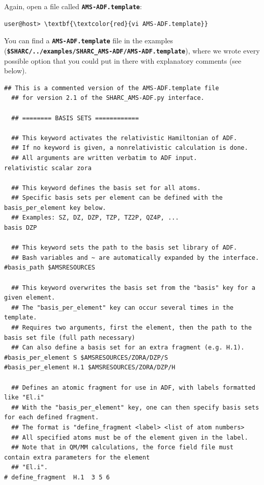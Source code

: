 \documentclass[a4paper,11pt,DIV=15,openany]{scrbook}
\newcommand{\ttt}[1]{\textbf{\texttt{#1}}}
\begin{document}
Again, open a file called \ttt{AMS-ADF.template}:
\begin{Verbatim}[commandchars=\\\{\}]
user@host> \textbf{\textcolor{red}{vi AMS-ADF.template}}
\end{Verbatim}
You can find a \ttt{AMS-ADF.template} file in the examples (\ttt{\$SHARC/../examples/SHARC\_AMS-ADF/AMS-ADF.template}), where we wrote every possible option that you could put in there with explanatory comments (see below).
\begin{oframed}
\footnotesize\begin{Verbatim}[commandchars=\\\{\}]
  ## This is a commented version of the AMS-ADF.template file 
  ## for version 2.1 of the SHARC_AMS-ADF.py interface.

  ## ======== BASIS SETS ============

  ## This keyword activates the relativistic Hamiltonian of ADF.
  ## If no keyword is given, a nonrelativistic calculation is done.
  ## All arguments are written verbatim to ADF input.
relativistic scalar zora

  ## This keyword defines the basis set for all atoms.
  ## Specific basis sets per element can be defined with the basis_per_element key below.
  ## Examples: SZ, DZ, DZP, TZP, TZ2P, QZ4P, ...
basis DZP

  ## This keyword sets the path to the basis set library of ADF.
  ## Bash variables and ~ are automatically expanded by the interface.
#basis_path $AMSRESOURCES

  ## This keyword overwrites the basis set from the "basis" key for a given element.
  ## The "basis_per_element" key can occur several times in the template.
  ## Requires two arguments, first the element, then the path to the basis set file (full path necessary)
  ## Can also define a basis set for an extra fragment (e.g. H.1).
#basis_per_element S $AMSRESOURCES/ZORA/DZP/S
#basis_per_element H.1 $AMSRESOURCES/ZORA/DZP/H

  ## Defines an atomic fragment for use in ADF, with labels formatted like "El.i"
  ## With the "basis_per_element" key, one can then specify basis sets for each defined fragment.
  ## The format is "define_fragment <label> <list of atom numbers>
  ## All specified atoms must be of the element given in the label.
  ## Note that in QM/MM calculations, the force field file must contain extra parameters for the element 
  ## "El.i".
# define_fragment  H.1  3 5 6




\end{Verbatim}
\end{oframed}
\end{document}
